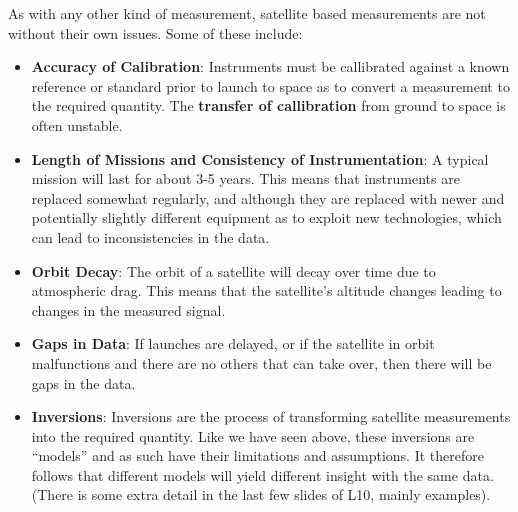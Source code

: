 As with any other kind of measurement, satellite based measurements are not
without their own issues. Some of these include:
\begin{itemize}
    \item \textbf{Accuracy of Calibration}: Instruments must be callibrated 
    against a known reference or standard prior to launch to space as to convert
    a measurement to the required quantity. The \textbf{transfer of callibration}
    from ground to space is often unstable.
    \item \textbf{Length of Missions and Consistency of Instrumentation}: A 
    typical mission will last for about 3-5 years. This means that instruments 
    are replaced somewhat regularly, and although they are replaced with newer 
    and potentially slightly different equipment as to exploit new technologies,
    which can lead to inconsistencies in the data.
    \item \textbf{Orbit Decay}: The orbit of a satellite will decay over time
    due to atmospheric drag. This means that the satellite's altitude changes
    leading to changes in the measured signal.
    \item \textbf{Gaps in Data}: If launches are delayed, or if the satellite
    in orbit malfunctions and there are no others that can take over, then there
    will be gaps in the data.
    \item \textbf{Inversions}: Inversions are the process of transforming 
    satellite measurements into the required quantity. Like we have seen above,
    these inversions are ``models'' and as such have their limitations and 
    assumptions. It therefore follows that different models will yield different
    insight with the same data. (There is some extra detail in the last few 
    slides of L10, mainly examples).    
\end{itemize}

